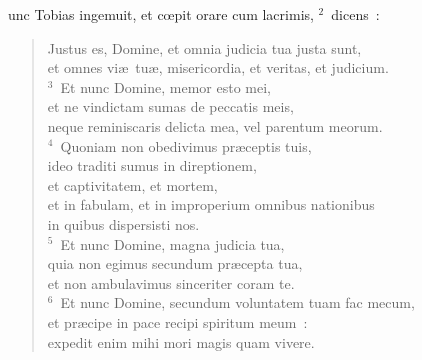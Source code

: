 \bchapter
{}unc Tobias ingemuit, et cœpit orare cum lacrimis,
${}^{2}$~dicens~: \begin{flushleft}\begin{verse}Justus es, Domine, et omnia judicia tua justa sunt,\\ et omnes vi\ae\ tu\ae , misericordia, et veritas, et judicium.\\
${}^{3}$~Et nunc Domine, memor esto mei,\\ et ne vindictam sumas de peccatis meis,\\ neque reminiscaris delicta mea, vel parentum meorum.\\
${}^{4}$~Quoniam non obedivimus pr\ae ceptis tuis,\\ ideo traditi sumus in direptionem,\\ et captivitatem, et mortem,\\ et in fabulam, et in improperium omnibus nationibus\\ in quibus dispersisti nos.\\
${}^{5}$~Et nunc Domine, magna judicia tua,\\ quia non egimus secundum pr\ae cepta tua,\\ et non ambulavimus sinceriter coram te.\\
${}^{6}$~Et nunc Domine, secundum voluntatem tuam fac mecum,\\ et pr\ae cipe in pace recipi spiritum meum~:\\ expedit enim mihi mori magis quam vivere.\end{verse}\end{flushleft}


